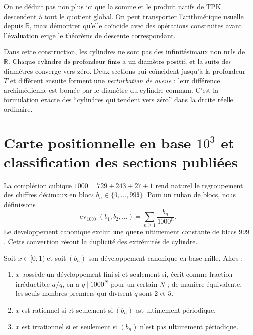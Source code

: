 On ne déduit pas non plus ici que la somme et le produit natifs de TPK descendent à
tout le quotient global. On peut transporter l'arithmétique usuelle depuis
\(\mathbb R\), mais démontrer qu'elle coïncide avec des opérations construites avant
l'évaluation exige le théorème de descente correspondant.

Dans cette construction, les cylindres ne sont pas des infinitésimaux non nuls de
\(\mathbb R\). Chaque cylindre de profondeur finie a un diamètre positif,
et la suite des diamètres converge vers zéro. Deux sections qui coïncident jusqu'à
la profondeur \(T\) et diffèrent ensuite forment une \emph{perturbation de
queue} ; leur différence archimédienne est bornée par le diamètre du cylindre
commun. C'est la formulation exacte des ``cylindres qui tendent vers zéro''
dans la droite réelle ordinaire.

\section{Carte positionnelle en base \(10^3\) et classification des sections publiées}

La complétion cubique
\(1000=729+243+27+1\) rend naturel le regroupement des chiffres décimaux en blocs
\(b_n\in\{0,\ldots,999\}\). Pour un ruban de blocs, nous définissons
\[
 \operatorname{ev}_{1000}(b_1,b_2,\ldots)
 =\sum_{n\geq1}\frac{b_n}{1000^n}.
\]
Le développement canonique exclut une queue ultimement constante de blocs
\(999\). Cette convention résout la duplicité des extrémités de cylindre.

\begin{theorem}
\label{thm:taxonomia-base-mil}
Soit \(x\in[0,1)\) et soit \((b_n)\) son développement canonique en base mille.
Alors :
\begin{enumerate}
\item \(x\) possède un développement fini si et seulement si, écrit comme
fraction irréductible \(a/q\), on a \(q\mid1000^N\) pour un certain \(N\) ;
de manière équivalente, les seuls nombres premiers qui divisent \(q\) sont \(2\) et \(5\).
\item \(x\) est rationnel si et seulement si \((b_n)\) est ultimement périodique.
\item \(x\) est irrationnel si et seulement si \((b_n)\) n'est pas ultimement
périodique.
\end{enumerate}
\end{theorem}

